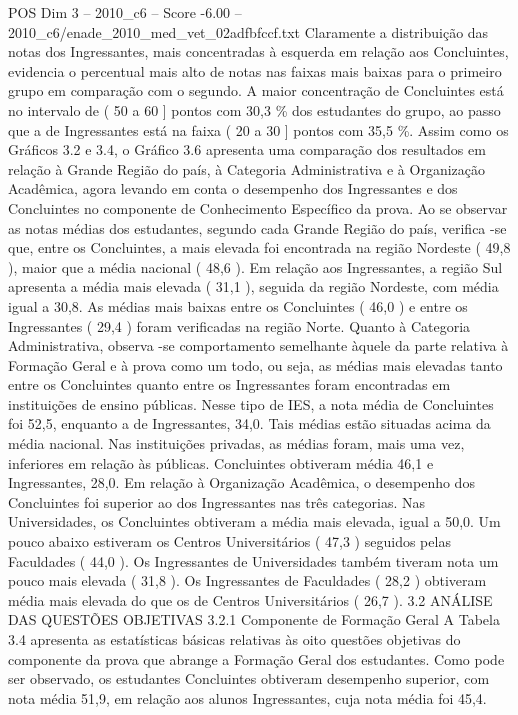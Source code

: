 \begin{textsample}{POS Dim 3 – 2010\_c6 – Score -6.00 – 2010\_c6/enade\_2010\_med\_vet\_02adfbfccf.txt}
Claramente a distribuição das notas dos Ingressantes, mais concentradas à esquerda em relação aos Concluintes, evidencia o percentual mais alto de notas nas faixas mais baixas para o primeiro grupo em comparação com o segundo.
A maior concentração de Concluintes está no intervalo de ( 50 a 60 ] pontos com 30,3 \% dos estudantes do grupo, ao passo que a de Ingressantes está na faixa ( 20 a 30 ] pontos com 35,5 \%.
Assim como os Gráficos 3.2 e 3.4, o Gráfico 3.6 apresenta uma comparação dos resultados em relação à Grande Região do país, à Categoria Administrativa e à Organização Acadêmica, agora levando em conta o desempenho dos Ingressantes e dos Concluintes no componente de Conhecimento Específico da prova.
Ao se observar as notas médias dos estudantes, segundo cada Grande Região do país, verifica -se que, entre os Concluintes, a mais elevada foi encontrada na região Nordeste ( 49,8 ), maior que a média nacional ( 48,6 ).
Em relação aos Ingressantes, a região Sul apresenta a média mais elevada ( 31,1 ), seguida da região Nordeste, com média igual a 30,8.
As médias mais baixas entre os Concluintes ( 46,0 ) e entre os Ingressantes ( 29,4 ) foram verificadas na região Norte.
Quanto à Categoria Administrativa, observa -se comportamento semelhante àquele da parte relativa à Formação Geral e à prova como um todo, ou seja, as médias mais elevadas tanto entre os Concluintes quanto entre os Ingressantes foram encontradas em instituições de ensino públicas.
Nesse tipo de IES, a nota média de Concluintes foi 52,5, enquanto a de Ingressantes, 34,0.
Tais médias estão situadas acima da média nacional.
Nas instituições privadas, as médias foram, mais uma vez, inferiores em relação às públicas.
Concluintes obtiveram média 46,1 e Ingressantes, 28,0.
Em relação à Organização Acadêmica, o desempenho dos Concluintes foi superior ao dos Ingressantes nas três categorias.
Nas Universidades, os Concluintes obtiveram a média mais elevada, igual a 50,0.
Um pouco abaixo estiveram os Centros Universitários ( 47,3 ) seguidos pelas Faculdades ( 44,0 ).
Os Ingressantes de Universidades também tiveram nota um pouco mais elevada ( 31,8 ).
Os Ingressantes de Faculdades ( 28,2 ) obtiveram média mais elevada do que os de Centros Universitários ( 26,7 ). 3.2 ANÁLISE DAS QUESTÕES OBJETIVAS 3.2.1 Componente de Formação Geral A Tabela 3.4 apresenta as estatísticas básicas relativas às oito questões objetivas do componente da prova que abrange a Formação Geral dos estudantes.
Como pode ser observado, os estudantes Concluintes obtiveram desempenho superior, com nota média 51,9, em relação aos alunos Ingressantes, cuja nota média foi 45,4.

\end{textsample}
